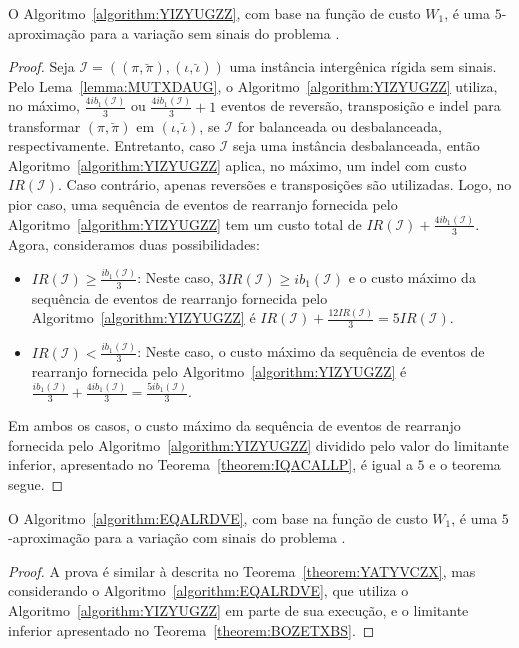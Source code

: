 \begin{theorem}\label{theorem:YATYVCZX}
O Algoritmo~\ref{algorithm:YIZYUGZZ}, com base na função de custo $W_1$, é uma $5$-aproximação para a variação sem sinais do problema \SbWIRTI{}.
\end{theorem}
\begin{proof}
Seja $\mathcal{I} = ((\pi,\breve\pi),(\iota,\breve\iota))$ uma instância intergênica rígida sem sinais. Pelo Lema~\ref{lemma:MUTXDAUG}, o Algoritmo~\ref{algorithm:YIZYUGZZ} utiliza, no máximo, $\frac{4ib_1(\mathcal{I})}{3}$ ou $\frac{4ib_1(\mathcal{I})}{3} + 1$ eventos de reversão, transposição e indel para transformar $(\pi,\breve\pi)$ em $(\iota,\breve\iota)$, se $\mathcal{I}$ for balanceada ou desbalanceada, respectivamente. Entretanto, caso $\mathcal{I}$ seja uma instância desbalanceada, então Algoritmo~\ref{algorithm:YIZYUGZZ} aplica, no máximo, um indel com custo $IR(\mathcal{I})$. Caso contrário, apenas reversões e transposições são utilizadas. Logo, no pior caso, uma sequência de eventos de rearranjo fornecida pelo Algoritmo~\ref{algorithm:YIZYUGZZ} tem um custo total de $IR(\mathcal{I}) + \frac{4ib_1(\mathcal{I})}{3}$. Agora, consideramos duas possibilidades:
\begin{itemize}
  \item $IR(\mathcal{I}) \ge \frac{ib_1(\mathcal{I})}{3}$: Neste caso, $3IR(\mathcal{I}) \ge ib_1(\mathcal{I})$ e o custo máximo da sequência de eventos de rearranjo fornecida pelo Algoritmo~\ref{algorithm:YIZYUGZZ} é $IR(\mathcal{I}) + \frac{12IR(\mathcal{I})}{3} = 5IR(\mathcal{I})$.
  \item $IR(\mathcal{I}) < \frac{ib_1(\mathcal{I})}{3}$: Neste caso, o custo máximo da sequência de eventos de rearranjo fornecida pelo Algoritmo~\ref{algorithm:YIZYUGZZ} é $\frac{ib_1(\mathcal{I})}{3} + \frac{4ib_1(\mathcal{I})}{3} = \frac{5ib_1(\mathcal{I})}{3}$.
\end{itemize}
Em ambos os casos, o custo máximo da sequência de eventos de rearranjo fornecida pelo Algoritmo~\ref{algorithm:YIZYUGZZ} dividido pelo valor do limitante inferior, apresentado no Teorema~\ref{theorem:IQACALLP}, é igual a $5$ e o teorema segue.
\end{proof}

\begin{theorem}\label{theorem:XMRIBCHD}
O Algoritmo~\ref{algorithm:EQALRDVE}, com base na função de custo $W_1$, é uma $5$-aproximação para a variação com sinais do problema \SbWIRI{}.
\end{theorem}
\begin{proof}
A prova é similar à descrita no Teorema~\ref{theorem:YATYVCZX}, mas considerando o Algoritmo~\ref{algorithm:EQALRDVE}, que utiliza o Algoritmo~\ref{algorithm:YIZYUGZZ} em parte de sua execução, e o limitante inferior apresentado no Teorema~\ref{theorem:BOZETXBS}.
\end{proof}

